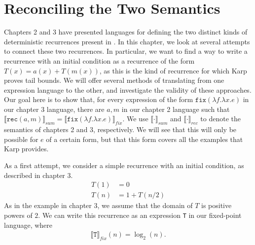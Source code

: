 \chapter{Reconciling the Two Semantics}
Chapters 2 and 3 have presented languages for defining the two distinct kinds of deterministic recurrences present in 
\cite{Karp}. In this chapter, we look at several attempts to connect these two recurrences. In particular, we want to find a 
way to write a recurrence with an initial condition as a recurrence of the form $T(x) = a(x) + T(m(x))$, as this is the kind
of recurrence for which Karp proves tail bounds. We will offer
several methods of translating from one expression language to the other, and investigate the validity of these 
approaches. Our goal here is to show that, for every expression of the form $\texttt{fix}(\lambda f.\lambda x.e)$ in our
 chapter 3 language, there are $a, m$ in our chapter 2 language such that 
 $\llbracket \texttt{rec}(a,m)\rrbracket_{sum} = \llbracket \texttt{fix}(\lambda f.\lambda x.e)\rrbracket_{fix}$. We use
 $\llbracket \cdot\rrbracket_{sum}$ and $\llbracket \cdot\rrbracket_{rec}$ to denote the semantics of chapters 2 and
 3, respectively. We will see that this will only be possible for $e$ of a certain form, but that this form covers all the 
 examples that Karp provides.

As a first attempt, we consider a simple recurrence with an initial condition, as described in chapter 3.
\begin{align*}
T(1) &= 0 \\
T(n) &= 1 + T(n/2 ) 
\end{align*}
As in the example in chapter 3, we assume that the domain of $T$ is positive powers of $2$.
We can write this recurrence as an expression \texttt{T} in our fixed-point language, where
\begin{align*}
\llbracket \texttt{T}\rrbracket_{fix}(n) = \log_2(n).
\end{align*} 

